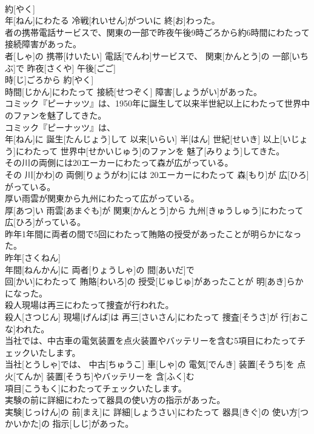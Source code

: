 \documentclass[8pt]{extreport}
\begin{document}
\begin{CJK}{UTF8}{min}
\\	約[やく] 
\\	年[ねん]にわたる 冷戦[れいせん]がついに 終[お]わった。
\\	者の携帯電話サービスで、関東の一部で昨夜午後9時ごろから約6時間にわたって接続障害があった。	
\\	者[しゃ]の 携帯[けいたい] 電話[でんわ]サービスで、 関東[かんとう]の 一部[いちぶ]で 昨夜[さくや] 午後[ごご] 
\\	時[じ]ごろから 約[やく] 
\\	時間[じかん]にわたって 接続[せつぞく] 障害[しょうがい]があった。
\\	コミック『ピーナッツ』は、1950年に誕生して以来半世紀以上にわたって世界中のファンを魅了してきた。	
\\	コミック『ピーナッツ』は、 
\\	年[ねん]に 誕生[たんじょう]して 以来[いらい] 半[はん] 世紀[せいき] 以上[いじょう]にわたって 世界中[せかいじゅう]のファンを 魅了[みりょう]してきた。
\\	その川の両側には20エーカーにわたって森が広がっている。	
\\	その 川[かわ]の 両側[りょうがわ]には 20エーカーにわたって 森[もり]が 広[ひろ]がっている。
\\	厚い雨雲が関東から九州にわたって広がっている。	
\\	厚[あつ]い 雨雲[あまぐも]が 関東[かんとう]から 九州[きゅうしゅう]にわたって 広[ひろ]がっている。
\\	昨年1年間に両者の間で5回にわたって賄賂の授受があったことが明らかになった。	
\\	昨年[さくねん] 
\\	年間[ねんかん]に 両者[りょうしゃ]の 間[あいだ]で 
\\	回[かい]にわたって 賄賂[わいろ]の 授受[じゅじゅ]があったことが 明[あき]らかになった。
\\	殺人現場は再三にわたって捜査が行われた。	
\\	殺人[さつじん] 現場[げんば]は 再三[さいさん]にわたって 捜査[そうさ]が 行[おこな]われた。
\\	当社では、中古車の電気装置を点火装置やバッテリーを含む5項目にわたってチェックいたします。	
\\	当社[とうしゃ]では、 中古[ちゅうこ] 車[しゃ]の 電気[でんき] 装置[そうち]を 点火[てんか] 装置[そうち]やバッテリーを 含[ふく]む 
\\	項目[こうもく]にわたってチェックいたします。
\\	実験の前に詳細にわたって器具の使い方の指示があった。	
\\	実験[じっけん]の 前[まえ]に 詳細[しょうさい]にわたって 器具[きぐ]の 使い方[つかいかた]の 指示[しじ]があった。

\end{CJK}
\end{document}
